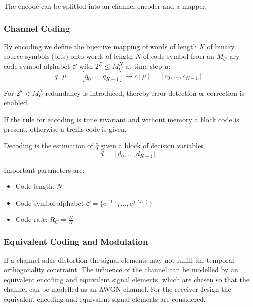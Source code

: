 The encode can be splitted into an channel encoder and a mapper.

\subsubsection{Channel Coding}
By encoding we define the bijective mapping of words of length $K$ of binary source symbols
(bits) onto words of length $N$ of code symbol from an $M_C$-ary code symbol alphabet
$\mathcal{C}$ with $2^K \leq M_C^N$ at time step $\mu$:
\begin{equation}
    q[\mu] = [q_0, \ldots, q_{K-1}] \to c[\mu] = [c_0, \ldots, c_{N-1}]
\end{equation}

For $2^k < M_C^N$ redundancy is introduced, thereby error detection or correction is enabled.

If the rule for encoding is time invariant and without memory a block code is present,
otherwise a trellis code is given.

Decoding is the estimation of $\hat{q}$ given a block of decision variables
\begin{equation}
    d = [d_0, \ldots, d_{K-1}]
\end{equation} 

Important parameters are:
\begin{itemize}
    \item Code length: $N$
    \item Code symbol alphabet $\mathcal{C} = \{c^{(1)}, \ldots, c^{(M_C)}\}$
    \item Code rate: $R_C = \frac{K}{N}$
\end{itemize}

\subsubsection{Equivalent Coding and Modulation}
If a channel adds distortion the signal elements may not fulfill the temporal
orthogonality constraint. The influence of the channel can be modelled by an
equivalent encoding and equivalent signal elements, which are chosen so
that the channel can be modelled as an AWGN channel. For the receiver design
the equivalent encoding and equivalent signal elements are considered.

